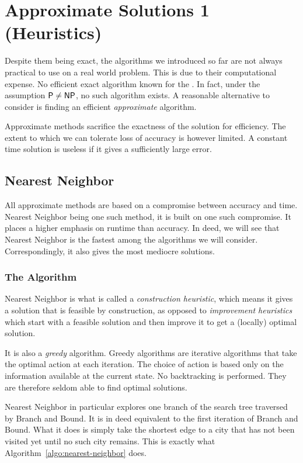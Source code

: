 \chapter{Approximate Solutions 1 (Heuristics)}

Despite them being exact, the algorithms we introduced so far are not always practical to use on a real world problem. This is due to their computational expense. No efficient exact algorithm known for the \TSP. In fact, under the assumption \(\textsf{P}\neq\textsf{NP}\), no such algorithm exists. A reasonable alternative to consider is finding an efficient \emph{approximate} algorithm.

Approximate methods sacrifice the exactness of the solution for efficiency. The extent to which we can tolerate loss of accuracy is however limited. A constant time solution is useless if it gives a sufficiently large error.

\section{Nearest Neighbor}


All approximate methods are based on a compromise between accuracy and time. Nearest Neighbor being one such method, it is built on one such compromise. It places a higher emphasis on runtime than accuracy. In deed, we will see that Nearest Neighbor is the fastest among the algorithms we will consider. Correspondingly, it also gives the most mediocre solutions.

\subsection{The Algorithm}

Nearest Neighbor is what is called a \emph{construction heuristic}, which means it gives a solution that is feasible by construction, as opposed to \emph{improvement heuristics} which start with a feasible solution and then improve it to get a (locally) optimal solution.

It is also a \emph{greedy} algorithm. Greedy algorithms are iterative algorithms that take the optimal action at each iteration. The choice of action is based only on the information available at the current state. No backtracking is performed. They are therefore seldom able to find optimal solutions.

Nearest Neighbor in particular explores one branch of the search tree traversed by Branch and Bound. It is in deed equivalent to the first iteration of Branch and Bound. What it does is simply take the shortest edge to a city that has not been visited yet until no such city remains. This is exactly what Algorithm~\ref{algo:nearest-neighbor} does.

